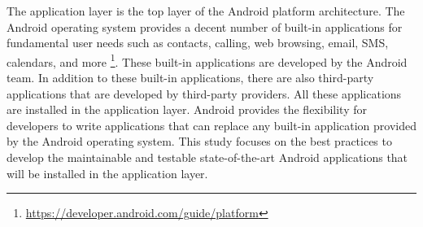 The application layer is the top layer of the Android platform architecture. The Android operating system provides a decent number of built-in applications for fundamental user needs such as contacts, calling, web browsing, email, SMS, calendars, and more \footnote{\url{https://developer.android.com/guide/platform}}. These built-in applications are developed by the Android team. In addition to these built-in applications, there are also third-party applications that are developed by third-party providers. All these applications are installed in the application layer. Android provides the flexibility for developers to write applications that can replace any built-in application provided by the Android operating system. This study focuses on the best practices to develop the maintainable and testable state-of-the-art Android applications that will be installed in the application layer.